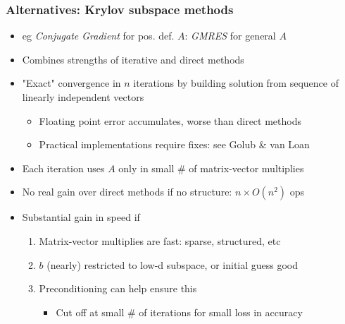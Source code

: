 \documentclass[bigger]{beamer}
\begin{document}
\begin{frame}%

\frametitle{Alternatives: Krylov subspace methods}

\begin{itemize}

\item eg \emph{Conjugate Gradient} for pos. def. $A$: \emph{GMRES} for general $A$

\item Combines strengths of iterative and direct methods

\item "Exact" convergence in $n$ iterations by building solution from sequence of linearly independent vectors
\begin{itemize}
\item Floating point error accumulates, worse than direct methods 
\item Practical implementations require fixes: see Golub \& van Loan
\end{itemize}

\item Each iteration uses $A$ only in small $\#$ of matrix-vector multiplies

\item No real gain over direct methods if no structure: $n\times O(n^2)$ ops
\item Substantial gain in speed if 
\begin{enumerate}
\item Matrix-vector multiplies are fast: sparse, structured, etc
\item $b$ (nearly) restricted to low-d subspace, or initial guess good
\item Preconditioning can help ensure this
\begin{itemize}
\item Cut off at small $\#$ of iterations for small loss in accuracy
\end{itemize}
\end{enumerate}






\end{itemize}


\end{frame}%
\end{document}
